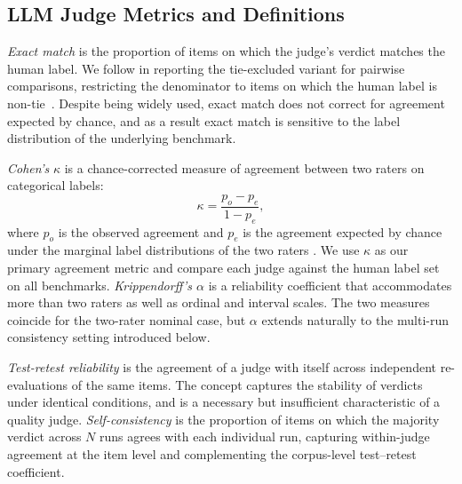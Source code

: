 \documentclass[11pt]{article}
\begin{document}
\subsection{LLM Judge Metrics and Definitions}


\textit{Exact match} is the proportion of items on which the judge's verdict matches the human label. We follow \citet{zheng2023judging} in reporting the tie-excluded variant for pairwise comparisons, restricting the denominator to items on which the human label is non-tie~\citep{wang-etal-2025-improving-llm-judge}. Despite being widely used, exact match does not correct for agreement expected by chance, and as a result exact match is sensitive to the label distribution of the underlying benchmark. 

\textit{Cohen's} $\kappa$ is a chance-corrected measure of agreement between two raters on categorical labels:
\begin{equation}
\kappa = \frac{p_o - p_e}{1 - p_e},
\end{equation}
where $p_o$ is the observed agreement and $p_e$ is the agreement expected by chance under the marginal label distributions of the two raters \citep{cohen1960coefficient}. We use $\kappa$ as our primary agreement metric and compare each judge against the human label set on all benchmarks. \textit{Krippendorff's $\alpha$} \citep{krippendorff2011computing} is a reliability coefficient that accommodates more than two raters as well as ordinal and interval scales. The two measures coincide for the two-rater nominal case, but $\alpha$ extends naturally to the multi-run consistency setting introduced below.

\textit{Test-retest reliability} is the agreement of a judge with itself across independent re-evaluations of the same items. The concept captures the stability of verdicts under identical conditions, and is a necessary but insufficient characteristic of a quality judge. %
\textit{Self-consistency} is the proportion of items on which the majority verdict across $N$ runs agrees with each individual run, capturing within-judge agreement at the item level and complementing the corpus-level test--retest coefficient. 
\end{document}
